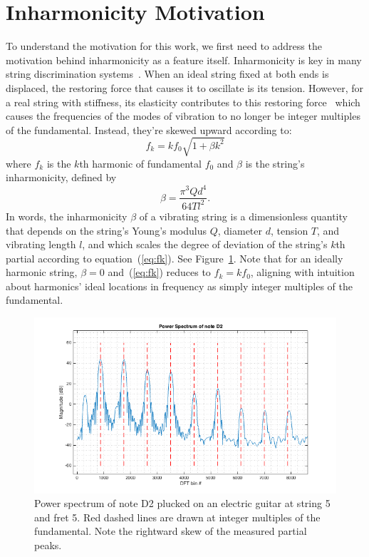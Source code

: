 \documentclass[12pt]{cmuthesis}
\begin{document}
\section{Inharmonicity Motivation}
To understand the motivation for this work, we first need to address the motivation behind inharmonicity as a feature itself. Inharmonicity is key in many string discrimination systems~\cite{barbanchoi2012,abesser2012,dittmar2013,kehling2014}. When an ideal string fixed at both ends is displaced, the restoring force that causes it to oscillate is its tension. However, for a real string with stiffness, its elasticity contributes to this restoring force~\cite{fletcher1962} which causes the frequencies of the modes of vibration to no longer be integer multiples of the fundamental. Instead, they're skewed upward according to: 
\begin{equation}
\label{eq:fk}
f_k = kf_{0}\sqrt{1+\beta k^2}
\end{equation}
where $f_k$ is the $k$th harmonic of fundamental $f_0$ and $\beta$ is the string's inharmonicity, defined by
\begin{equation}
\beta = \frac{\pi^3 Q d^4}{64 T l^2}. \label{eq:beta}
\end{equation}
In words, the inharmonicity $\beta$ of a vibrating string is a dimensionless quantity that depends on the string's Young's modulus $Q$, diameter $d$, tension $T$, and vibrating length $l$, and which scales the degree of deviation of the string's $k$th partial according to equation~(\ref{eq:fk}). See Figure~\ref{fig:skew}. Note that for an ideally harmonic string, $\beta = 0$ and~(\ref{eq:fk}) reduces to $f_k = kf_0$, aligning with intuition about harmonics' ideal locations in frequency as simply integer multiples of the fundamental.

\begin{figure}[!htbp]
\centering
\includegraphics[scale=0.65]{skew}
\caption{Power spectrum of note D2 plucked on an electric guitar at string 5 and fret 5. Red dashed lines are drawn at integer multiples of the fundamental. Note the rightward skew of the measured partial peaks.}
\label{fig:skew}
\end{figure}
\end{document}
